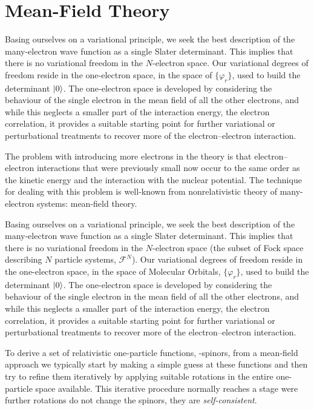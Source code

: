 \section{Mean-Field Theory}\label{sec:mean-field}

Basing ourselves on a variational principle, we seek the best
description of the many-electron wave function as a single Slater
determinant. This implies that there is no variational freedom in the
$N$-electron space. Our variational degrees of freedom reside in
the one-electron space, \ie in the space of 
$\lbrace\varphi_r\rbrace$, used to build the determinant $\Ket{0}$.
The one-electron space is developed by considering the behaviour of the
single electron in the mean field of all the other electrons, and while
this neglects a smaller part of the interaction energy, the electron
correlation, it provides a suitable starting point for further
variational or perturbational treatments to recover more of the
electron--electron interaction.


The problem with introducing more electrons in the theory is that
electron--electron interactions that were previously small now occur to
the same order as the kinetic energy and the interaction with the
nuclear potential. The technique for dealing with this problem is
well-known from nonrelativistic theory of many-electron systems:
mean-field theory.

Basing ourselves on a variational principle, we seek the best
description of the many-electron wave function as a single Slater
determinant. This implies that there is no variational freedom in the
$N$-electron space (\ie the subset of Fock space describing $N$ particle
systems, $\mathcal{F}^N$). Our variational degrees of freedom reside in
the one-electron space, \ie in the space of Molecular Orbitals,
$\lbrace\varphi_r\rbrace$, used to build the determinant $\Ket{0}$.
The one-electron space is developed by considering the behaviour of the
single electron in the mean field of all the other electrons, and while
this neglects a smaller part of the interaction energy, the electron
correlation, it provides a suitable starting point for further
variational or perturbational treatments to recover more of the
electron--electron interaction.

To derive a set of relativistic one-particle functions, -spinors,
from a mean-field approach we typically start by making a simple guess
at these functions and then try to refine them iteratively by applying
suitable rotations in the entire one-particle space available. This
iterative procedure normally reaches a stage were further rotations do
not change the spinors, \ie they are \emph{self-consistent}.

